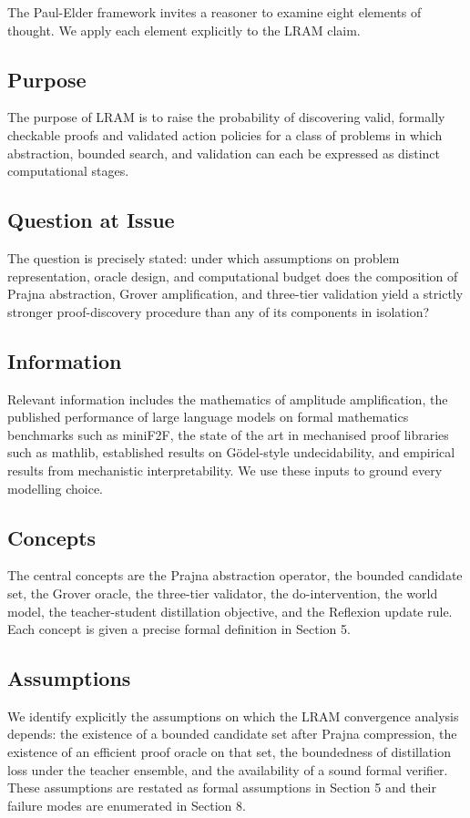 The Paul-Elder framework invites a reasoner to examine eight elements of thought. We apply each element explicitly to the LRAM claim.

\subsection{Purpose}
The purpose of LRAM is to raise the probability of discovering valid, formally checkable proofs and validated action policies for a class of problems in which abstraction, bounded search, and validation can each be expressed as distinct computational stages.

\subsection{Question at Issue}
The question is precisely stated: under which assumptions on problem representation, oracle design, and computational budget does the composition of Prajna abstraction, Grover amplification, and three-tier validation yield a strictly stronger proof-discovery procedure than any of its components in isolation?

\subsection{Information}
Relevant information includes the mathematics of amplitude amplification, the published performance of large language models on formal mathematics benchmarks such as miniF2F, the state of the art in mechanised proof libraries such as mathlib, established results on Gödel-style undecidability, and empirical results from mechanistic interpretability. We use these inputs to ground every modelling choice.

\subsection{Concepts}
The central concepts are the Prajna abstraction operator, the bounded candidate set, the Grover oracle, the three-tier validator, the do-intervention, the world model, the teacher-student distillation objective, and the Reflexion update rule. Each concept is given a precise formal definition in Section 5.

\subsection{Assumptions}
We identify explicitly the assumptions on which the LRAM convergence analysis depends: the existence of a bounded candidate set after Prajna compression, the existence of an efficient proof oracle on that set, the boundedness of distillation loss under the teacher ensemble, and the availability of a sound formal verifier. These assumptions are restated as formal assumptions in Section 5 and their failure modes are enumerated in Section 8.

